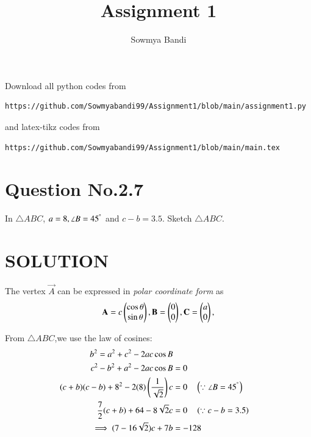 \documentclass[journal,12pt,twocolumn]{IEEEtran}
\begin{document}
     \def\rightbox#1{\makebox[0in][r]{#1}}
     \def\centbox#1{\makebox[0in]{#1}}
     \def\topbox#1{\raisebox{-\baselineskip}[0in][0in]{#1}}
     \def\midbox#1{\raisebox{-0.5\baselineskip}[0in][0in]{#1}}
\vspace{3cm}
\title{Assignment 1}
\author{Sowmya Bandi}
\maketitle
\newpage
\bigskip
\renewcommand{\thefigure}{\theenumi}
\renewcommand{\thetable}{\theenumi}
Download all python codes from 
\begin{lstlisting}
https://github.com/Sowmyabandi99/Assignment1/blob/main/assignment1.py
\end{lstlisting}
%
and latex-tikz codes from 
\begin{lstlisting}
https://github.com/Sowmyabandi99/Assignment1/blob/main/main.tex
\end{lstlisting}
%
\section{Question No.2.7}
\item In $\triangle ABC$,  $a = 8, \angle B = 45^{\degree}$ and $c-b = 3.5$.
Sketch $\triangle ABC$.
 
\section{SOLUTION}
 
The vertex  $\vec{A}$ can  be expressed  in {\em polar coordinate form} as
\begin{align}
\mathbf{A} = c\begin{pmatrix}\cos \theta\\  \sin \theta\end{pmatrix} ,\mathbf{B} = \begin{pmatrix}0\\0\end{pmatrix},\mathbf{C} = \begin{pmatrix}a\\0\end{pmatrix},
\end{align}

From $\triangle ABC$,we use the law of cosines: 
\begin{align}
b^2 = a^2 + c^2 - 2ac \cos B
\\
c^2 - b^2 + a^2 - 2ac \cos B &= 0
\\
(c+b)(c-b) + 8^2 - 2(8)\left(\frac{1}{\sqrt{2}}\right)c &= 0 \quad \left(\because \angle B = 45^{\degree}\right)
\\
\frac{7}{2}(c+b) + 64 - 8\sqrt{2}c &= 0 \quad \left(\because c-b = 3.5\right)
\\
\implies (7 - 16\sqrt{2})c + 7b &= -128
\end{align}
\end{document}
